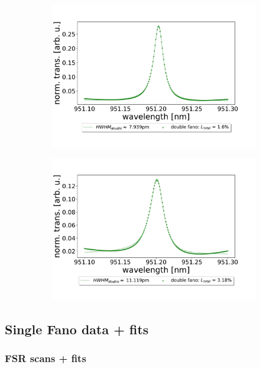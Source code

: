\begin{figure}[h!]
\begin{subfigure}[b]{0.49\textwidth}
        \includegraphics[width=\textwidth]{figures/double_16_percent_loss_30um.pdf}
        \caption{}
        \label{fig:1.6_percent_loss}
    \end{subfigure}
    \begin{subfigure}[b]{0.49\textwidth}
        \includegraphics[width=\textwidth]{figures/double_32_percent_loss_30um.pdf}
        \caption{}
        \label{fig:3.2_percent_loss}
    \end{subfigure}
\end{figure}

\subsection{Single Fano data + fits}

\subsubsection*{FSR scans + fits}


